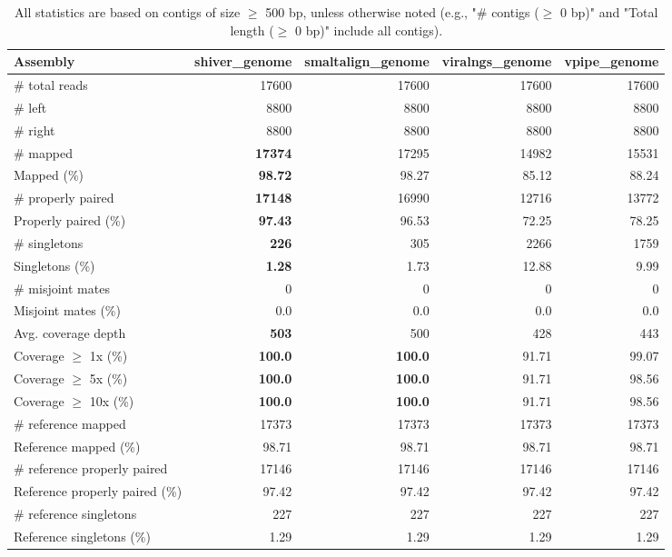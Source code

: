 \documentclass[12pt,a4paper]{article}
\begin{document}
\begin{table}[ht]
\begin{center}
\caption{All statistics are based on contigs of size $\geq$ 500 bp, unless otherwise noted (e.g., "\# contigs ($\geq$ 0 bp)" and "Total length ($\geq$ 0 bp)" include all contigs).}
\begin{tabular}{|l*{4}{|r}|}
\hline
Assembly & shiver\_genome & smaltalign\_genome & viralngs\_genome & vpipe\_genome \\ \hline
\# total reads & 17600 & 17600 & 17600 & 17600 \\ \hline
\# left & 8800 & 8800 & 8800 & 8800 \\ \hline
\# right & 8800 & 8800 & 8800 & 8800 \\ \hline
\# mapped & {\bf 17374} & 17295 & 14982 & 15531 \\ \hline
Mapped (\%) & {\bf 98.72} & 98.27 & 85.12 & 88.24 \\ \hline
\# properly paired & {\bf 17148} & 16990 & 12716 & 13772 \\ \hline
Properly paired (\%) & {\bf 97.43} & 96.53 & 72.25 & 78.25 \\ \hline
\# singletons & {\bf 226} & 305 & 2266 & 1759 \\ \hline
Singletons (\%) & {\bf 1.28} & 1.73 & 12.88 & 9.99 \\ \hline
\# misjoint mates & 0 & 0 & 0 & 0 \\ \hline
Misjoint mates (\%) & 0.0 & 0.0 & 0.0 & 0.0 \\ \hline
Avg. coverage depth & {\bf 503} & 500 & 428 & 443 \\ \hline
Coverage $\geq$ 1x (\%) & {\bf 100.0} & {\bf 100.0} & 91.71 & 99.07 \\ \hline
Coverage $\geq$ 5x (\%) & {\bf 100.0} & {\bf 100.0} & 91.71 & 98.56 \\ \hline
Coverage $\geq$ 10x (\%) & {\bf 100.0} & {\bf 100.0} & 91.71 & 98.56 \\ \hline
\# reference mapped & 17373 & 17373 & 17373 & 17373 \\ \hline
Reference mapped (\%) & 98.71 & 98.71 & 98.71 & 98.71 \\ \hline
\# reference properly paired & 17146 & 17146 & 17146 & 17146 \\ \hline
Reference properly paired (\%) & 97.42 & 97.42 & 97.42 & 97.42 \\ \hline
\# reference singletons & 227 & 227 & 227 & 227 \\ \hline
Reference singletons (\%) & 1.29 & 1.29 & 1.29 & 1.29 \\ \hline

\end{tabular}
\end{center}
\end{table}
\end{document}
